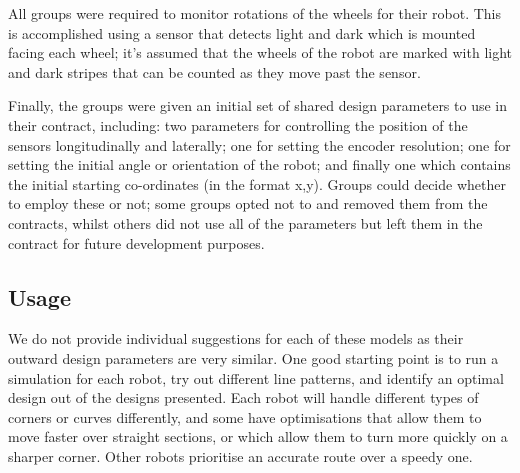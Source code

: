 All groups were required to monitor rotations of the wheels for their
robot.  This is accomplished using a sensor that detects light and dark
which is mounted facing each wheel; it's assumed that the wheels of
the robot are marked with light and dark stripes that can be counted
as they move past the sensor.

Finally, the groups were given an initial set of shared design
parameters to use in their contract, including: two 
parameters for controlling the position of the sensors longitudinally
and laterally; one  for setting the encoder resolution; one
 for setting the initial angle or orientation of the robot;
and finally one  which contains the initial starting
co-ordinates (in the format x,y).  Groups could decide whether to
employ these or not; some groups opted not to and removed them from
the contracts, whilst others did not use all of the parameters but
left them in the contract for future development purposes.

\subsection{Usage}
We do not provide individual suggestions for each of these models as
their outward design parameters are very similar.  One good starting
point is to run a simulation for each robot, try out different line
patterns, and identify an optimal design out of the designs presented.
Each robot will handle different types of corners or curves
differently, and some have optimisations that allow them to move
faster over straight sections, or which allow them to turn more
quickly on a sharper corner.  Other robots prioritise an accurate
route over a speedy one.

